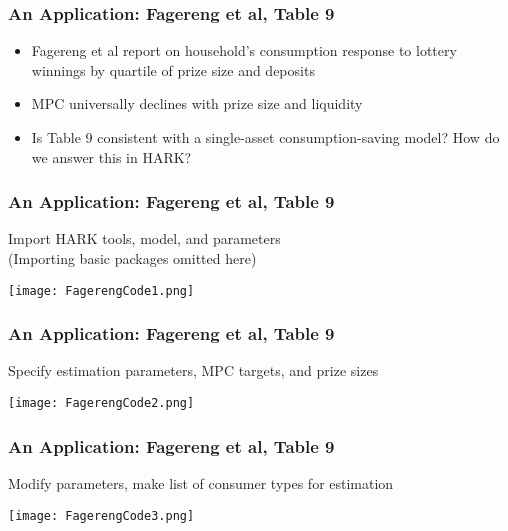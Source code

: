 \documentclass[11ptt]{beamer}
\begin{document}
\begin{frame}
\frametitle{An Application: Fagereng et al, Table 9}

\begin{itemize}
\item Fagereng et al report on household's consumption response to lottery winnings by quartile of prize size and deposits

\item MPC universally declines with prize size and liquidity

\item Is Table 9 consistent with a single-asset consumption-saving model?  How do we answer this in HARK?

\end{itemize}
\end{frame}



\begin{frame}
\frametitle{An Application: Fagereng et al, Table 9}

Import HARK tools, model, and parameters\\
(Importing basic packages omitted here)
\begin{center}
\texttt{[image: FagerengCode1.png]}
\end{center}

\end{frame}



\begin{frame}
\frametitle{An Application: Fagereng et al, Table 9}

Specify estimation parameters, MPC targets, and prize sizes
\begin{center}
\texttt{[image: FagerengCode2.png]}
\end{center}

\end{frame}



\begin{frame}
\frametitle{An Application: Fagereng et al, Table 9}

Modify parameters, make list of consumer types for estimation
\begin{center}
\texttt{[image: FagerengCode3.png]}
\end{center}

\end{frame}
\end{document}
